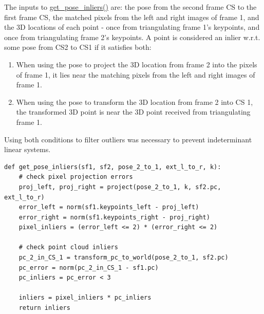 \documentclass[12pt]{article}
\begin{document}
The inputs to \href{https://github.com/ehud-gordon/VAN_ex/blob/master/src/calib3d/pnp.py#L125}{get_pose_inliers()} are: the pose from the second frame CS to the first frame CS, the matched pixels from the left and right images of frame 1,  and the 3D locations of each point - once from triangulating frame 1's keypoints, and once from triangulating frame 2's keypoints. A point is considered an inlier w.r.t. some pose from CS2 to CS1 if it satisfies both:
\begin{enumerate}
    \item When using the pose to project the 3D location from frame 2 into the pixels of frame 1, it lies near the matching pixels from the left and right images of frame 1.
    \item When using the pose to transform the 3D location from frame 2 into CS 1, the transformed 3D point is near the 3D point received from triangulating frame 1.
\end{enumerate}
Using both conditions to filter outliers was necessary to prevent indeterminant linear systems.
\begin{tcolorbox}
\begin{verbatim}  
def get_pose_inliers(sf1, sf2, pose_2_to_1, ext_l_to_r, k):
    # check pixel projection errors
    proj_left, proj_right = project(pose_2_to_1, k, sf2.pc, ext_l_to_r)
    error_left = norm(sf1.keypoints_left - proj_left)
    error_right = norm(sf1.keypoints_right - proj_right)
    pixel_inliers = (error_left <= 2) * (error_right <= 2)

    # check point cloud inliers
    pc_2_in_CS_1 = transform_pc_to_world(pose_2_to_1, sf2.pc)
    pc_error = norm(pc_2_in_CS_1 - sf1.pc)
    pc_inliers = pc_error < 3

    inliers = pixel_inliers * pc_inliers
    return inliers
\end{verbatim}
\end{tcolorbox}
\end{document}
